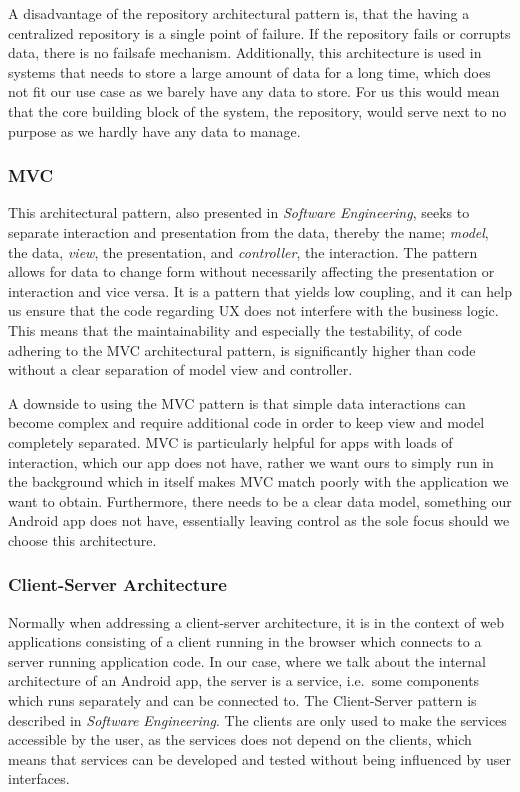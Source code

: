 A disadvantage of the repository architectural pattern is, that the having a centralized repository is a single point of failure.
If the repository fails or corrupts data, there is no failsafe mechanism.
Additionally, this architecture is used in systems that needs to store a large amount of data for a long time, which does not fit our use case as we barely have any data to store.
For us this would mean that the core building block of the system, the repository, would serve next to no purpose as we hardly have any data to manage.

\subsubsection{\acl{MVC}}
This architectural pattern, also presented in \textit{Software Engineering}\cite[p. 176]{sommerville}, seeks to separate interaction and presentation from the data, thereby the name; \textit{model}, the data, \textit{view}, the presentation, and \textit{controller}, the interaction.
The pattern allows for data to change form without necessarily affecting the presentation or interaction and vice versa.
It is a pattern that yields low coupling, and it can help us ensure that the code regarding \ac{UX} does not interfere with the business logic.
This means that the maintainability and especially the testability, of code adhering to the \ac{MVC} architectural pattern, is significantly higher than code without a clear separation of model view and controller.

A downside to using the MVC pattern is that simple data interactions can become complex and require additional code in order to keep view and model completely separated.
MVC is particularly helpful for apps with loads of interaction, which our app does not have, rather we want ours to simply run in the background which in itself makes MVC match poorly with the application we want to obtain.
Furthermore, there needs to be a clear data model, something our Android app does not have, essentially leaving control as the sole focus should we choose this architecture.

\subsubsection{Client-Server Architecture}
Normally when addressing a client-server architecture, it is in the context of web applications consisting of a client running in the browser which connects to a server running application code.
In our case, where we talk about the internal architecture of an Android app, the server is a service, i.e.~some components which runs separately and can be connected to.
The Client-Server pattern is described in \textit{Software Engineering}\cite[p. 180-181]{sommerville}.
The clients are only used to make the services accessible by the user, as the services does not depend on the clients, which means that services can be developed and tested without being influenced by user interfaces.

